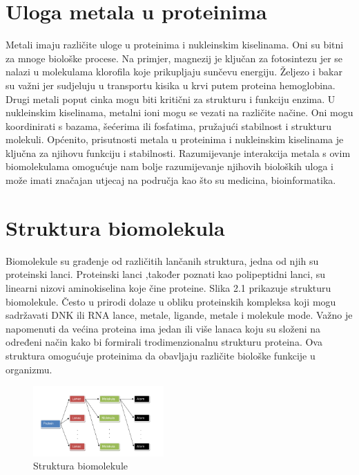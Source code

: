 \documentclass[times, utf8, zavrsni]{fer}
\begin{document}
\section{Uloga metala u proteinima}
 Metali imaju različite uloge u proteinima i nukleinskim kiselinama. Oni su bitni za mnoge biološke procese. Na primjer, magnezij je ključan za fotosintezu jer se nalazi u molekulama klorofila koje prikupljaju sunčevu energiju. Željezo i bakar su važni jer sudjeluju u transportu kisika u krvi putem proteina hemoglobina. Drugi metali poput cinka mogu biti kritični za strukturu i funkciju enzima. U nukleinskim kiselinama, metalni ioni mogu se vezati na različite načine. Oni mogu koordinirati s bazama, šećerima ili fosfatima, pružajući stabilnost i strukturu molekuli. Općenito, prisutnosti metala u proteinima i nukleinskim kiselinama je ključna za njihovu funkciju i stabilnosti. Razumijevanje interakcija metala s ovim biomolekulama omogućuje nam bolje razumijevanje njihovih bioloških uloga i može imati značajan utjecaj na područja kao što su medicina, bioinformatika.

\section{Struktura biomolekula}
Biomolekule su građenje od različitih lančanih struktura, jedna od njih su proteinski lanci. Proteinski lanci ,također poznati kao polipeptidni lanci, su linearni nizovi 
aminokiselina koje čine proteine. Slika 2.1 prikazuje strukturu biomolekule. Često u prirodi dolaze u obliku proteinskih kompleksa koji mogu sadržavati DNK ili RNA lance, metale, ligande, metale i molekule mode. Važno je napomenuti da većina proteina ima jedan ili više lanaca koju su složeni na određeni način kako bi formirali  trodimenzionalnu strukturu proteina. Ova struktura omogućuje proteinima da obavljaju različite biološke funkcije u organizmu.

\begin{figure}[htb]
\centering
\includegraphics[width=5cm]{img/protein.png}
\caption{Struktura biomolekule}
\end{figure}
\end{document}
